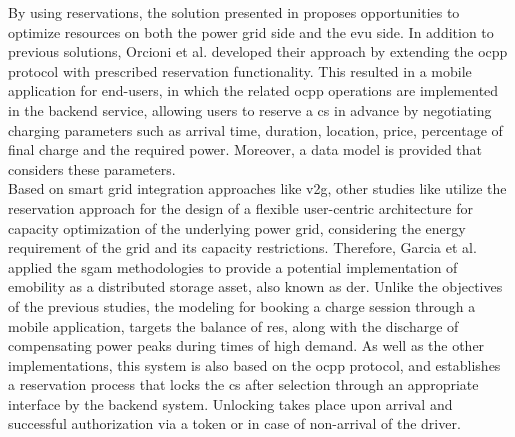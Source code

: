 By using reservations, the solution presented in \cite{orcioni_electric_2018} proposes opportunities to optimize resources on both the power grid side and the \acrshort{evu} side.
In addition to previous solutions, Orcioni et al. developed their approach by extending the \acrshort{ocpp} protocol with prescribed reservation functionality.
This resulted in a mobile application for end-users, in which the related \acrshort{ocpp} operations are implemented in the backend service, allowing users to reserve a \acrshort{cs} in advance by negotiating charging parameters such as arrival time, duration, location, price, percentage of final charge and the required power.
Moreover, a data model is provided that considers these parameters. \\
\noindent Based on smart grid integration approaches like \acrshort{v2g}, other studies like \cite{garcia_sgam-based_2023} utilize the reservation approach for the design of a flexible user-centric architecture for capacity optimization of the underlying power grid, considering the energy requirement of the grid and its capacity restrictions.
Therefore, Garcia et al. applied the \acrshort{sgam} \cite{noauthor_sgam_nodate} methodologies to provide a potential implementation of \acrshort{emobility} as a distributed storage asset, also known as \acrshort{der}.
Unlike the objectives of the previous studies, the modeling for booking a charge session through a mobile application, targets the balance of \acrshort{res}, along with the discharge of  compensating power peaks during times of high demand. 
As well as the other implementations, this system is also based on the \acrshort{ocpp} protocol, and establishes a reservation process that locks the \acrshort{cs} after selection through an appropriate interface by the backend system. Unlocking takes place upon arrival and successful authorization via a token or in case of non-arrival of the driver. \\
